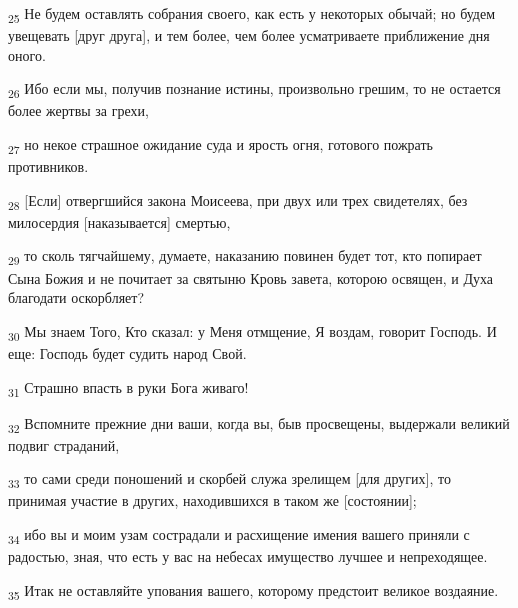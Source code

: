 \begin{tcolorbox}
\textsubscript{25} Не будем оставлять собрания своего, как есть у некоторых обычай; но будем увещевать [друг друга], и тем более, чем более усматриваете приближение дня оного.
\end{tcolorbox}
\begin{tcolorbox}
\textsubscript{26} Ибо если мы, получив познание истины, произвольно грешим, то не остается более жертвы за грехи,
\end{tcolorbox}
\begin{tcolorbox}
\textsubscript{27} но некое страшное ожидание суда и ярость огня, готового пожрать противников.
\end{tcolorbox}
\begin{tcolorbox}
\textsubscript{28} [Если] отвергшийся закона Моисеева, при двух или трех свидетелях, без милосердия [наказывается] смертью,
\end{tcolorbox}
\begin{tcolorbox}
\textsubscript{29} то сколь тягчайшему, думаете, наказанию повинен будет тот, кто попирает Сына Божия и не почитает за святыню Кровь завета, которою освящен, и Духа благодати оскорбляет?
\end{tcolorbox}
\begin{tcolorbox}
\textsubscript{30} Мы знаем Того, Кто сказал: у Меня отмщение, Я воздам, говорит Господь. И еще: Господь будет судить народ Свой.
\end{tcolorbox}
\begin{tcolorbox}
\textsubscript{31} Страшно впасть в руки Бога живаго!
\end{tcolorbox}
\begin{tcolorbox}
\textsubscript{32} Вспомните прежние дни ваши, когда вы, быв просвещены, выдержали великий подвиг страданий,
\end{tcolorbox}
\begin{tcolorbox}
\textsubscript{33} то сами среди поношений и скорбей служа зрелищем [для других], то принимая участие в других, находившихся в таком же [состоянии];
\end{tcolorbox}
\begin{tcolorbox}
\textsubscript{34} ибо вы и моим узам сострадали и расхищение имения вашего приняли с радостью, зная, что есть у вас на небесах имущество лучшее и непреходящее.
\end{tcolorbox}
\begin{tcolorbox}
\textsubscript{35} Итак не оставляйте упования вашего, которому предстоит великое воздаяние.
\end{tcolorbox}
